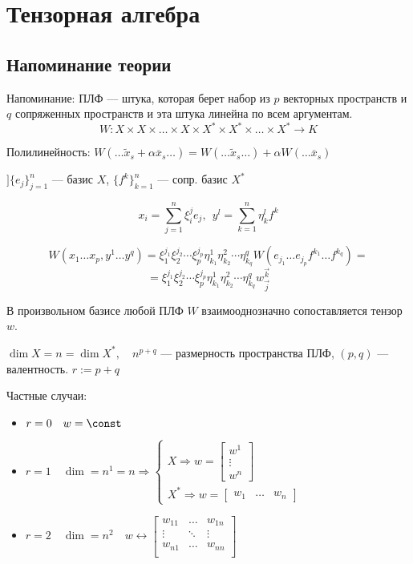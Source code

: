 

\cfoot{}



\section{Тензорная алгебра}

\subsection{Напоминание теории}

Напоминание: ПЛФ --- штука, которая берет набор из $p$ векторных пространств и $q$ сопряженных пространств и эта штука линейна по всем аргументам.
\[W:X\times X\times \ldots \times X\times X^*\times X^*\times\ldots\times X^*\to K\]

Полилинейность: $W(\ldots \tilde x_s + \alpha\overline x_s\ldots ) = W(\ldots \tilde x_s\ldots ) + \alpha W(\ldots \overline x_s)$

$] \{e_j\}_{j=1}^n$ --- базис \(X\), \(\{f^k\}_{k=1}^n\) --- сопр. базис \(X^*\)

\[x_i=\sum\limits_{j=1}^n \xi_i^j e_j,\ \ y^l=\sum\limits_{k=1}^n \eta ^l_k f^k\]

\[W(x_1\ldots x_p, y^1\ldots y^q)=\xi_1^{j_1}\xi_2^{j_2}\cdots \xi_p^{j_p}\eta^1_{k_1}\eta^2_{k_2}\cdots \eta^q_{k_q} W(e_{j_1} \ldots e_{j_p} f^{k_1}\ldots f^{k_q})=\]
\[=\xi_1^{j_1}\xi_2^{j_2}\cdots \xi_p^{j_p}\eta^1_{k_1}\eta^2_{k_2}\cdots \eta^q_{k_q} w_{\vec j}^{\vec k}\]

В произвольном базисе любой ПЛФ $W$ взаимооднозначно сопоставляется тензор $w$.

\(\dim X = n =\dim X^*, \quad n^{p+q}\) --- размерность пространства ПЛФ, \((p, q)\) --- валентность. $r:=p+q$

Частные случаи:
\begin{itemize}
    \item \(r=0 \quad w=\const\)
    \item \(r=1 \quad \dim=n^1=n \Rightarrow \begin{cases}
        X \Rightarrow w=\begin{bmatrix}
            w^1 \\
            \vdots \\
            w^n
        \end{bmatrix} \\
        X^*\Rightarrow w = \begin{bmatrix}
            w_1 & \ldots & w_n
        \end{bmatrix}
    \end{cases}\)
    \item \(r = 2\quad \dim=n^2\quad w\leftrightarrow \begin{bmatrix}
        w_{11} & \ldots & w_{1n} \\
        \vdots & \ddots & \vdots \\
        w_{n1} & \ldots & w_{nn} \\
    \end{bmatrix}\)
\end{itemize}

